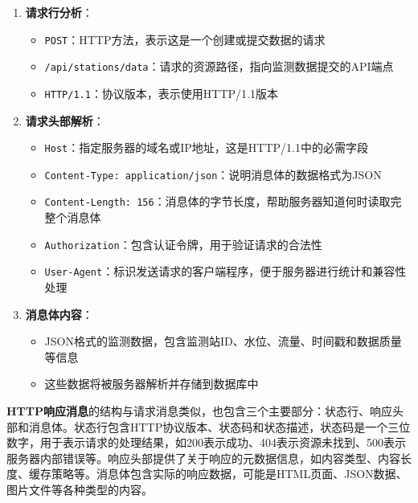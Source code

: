 \begin{enumerate}
\def\labelenumi{\arabic{enumi}.}
\tightlist
\item
  \textbf{请求行分析}：

  \begin{itemize}
  \tightlist
  \item
    \texttt{POST}：HTTP方法，表示这是一个创建或提交数据的请求
  \item
    \texttt{/api/stations/data}：请求的资源路径，指向监测数据提交的API端点
  \item
    \texttt{HTTP/1.1}：协议版本，表示使用HTTP/1.1版本
  \end{itemize}
\item
  \textbf{请求头部解析}：

  \begin{itemize}
  \tightlist
  \item
    \texttt{Host}：指定服务器的域名或IP地址，这是HTTP/1.1中的必需字段
  \item
    \texttt{Content-Type:\ application/json}：说明消息体的数据格式为JSON
  \item
    \texttt{Content-Length:\ 156}：消息体的字节长度，帮助服务器知道何时读取完整个消息体
  \item
    \texttt{Authorization}：包含认证令牌，用于验证请求的合法性
  \item
    \texttt{User-Agent}：标识发送请求的客户端程序，便于服务器进行统计和兼容性处理
  \end{itemize}
\item
  \textbf{消息体内容}：

  \begin{itemize}
  \tightlist
  \item
    JSON格式的监测数据，包含监测站ID、水位、流量、时间戳和数据质量等信息
  \item
    这些数据将被服务器解析并存储到数据库中
  \end{itemize}
\end{enumerate}

\textbf{HTTP响应消息}的结构与请求消息类似，也包含三个主要部分：状态行、响应头部和消息体。状态行包含HTTP协议版本、状态码和状态描述，状态码是一个三位数字，用于表示请求的处理结果，如200表示成功、404表示资源未找到、500表示服务器内部错误等。响应头部提供了关于响应的元数据信息，如内容类型、内容长度、缓存策略等。消息体包含实际的响应数据，可能是HTML页面、JSON数据、图片文件等各种类型的内容。

\begin{Shaded}
\begin{Highlighting}[]

\NormalTok{\{}
\NormalTok{\}}
\end{Highlighting}
\end{Shaded}

